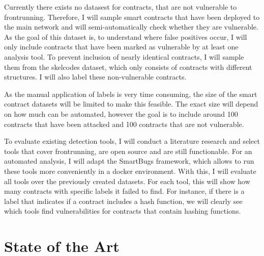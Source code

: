 \documentclass[paper=a4,fontsize=11pt,oneside,titlepage]{scrartcl}
\begin{document}
Currently there exists no datasest for contracts, that are not vulnerable to frontrunning. Therefore, I will sample smart contracts that have been deployed to the main network and will semi-automatically check whether they are vulnerable. As the goal of this dataset is, to understand where false positives occur, I will only include contracts that have been marked as vulnerable by at least one analysis tool. To prevent inclusion of nearly identical contracts, I will sample them from the skelcodes dataset\cite{di_angelo_evolution_2023}, which only consists of contracts with different structures. I will also label these non-vulnerable contracts.

As the manual application of labels is very time consuming, the size of the smart contract datasets will be limited to make this feasible. The exact size will depend on how much can be automated, however the goal is to include around 100 contracts that have been attacked and 100 contracts that are not vulnerable.

To evaluate existing detection tools, I will conduct a literature research and select tools that cover frontrunning, are open source and are still functionable. For an automated analysis, I will adapt the SmartBugs framework\cite{di_angelo_smartbugs_2023}, which allows to run these tools more conveniently in a docker environment. With this, I will evaluate all tools over the previously created datasets. For each tool, this will show how many contracts with specific labels it failed to find. For instance, if there is a label that indicates if a contract includes a hash function, we will clearly see which tools find vulnerabilities for contracts that contain hashing functions.


\iffalse
\begin{itemize}
\item How will the goals and results of \autoref{sec:results} be addressed and achieved?
\item What working directions/methods will be used and investigated?
\item How do you plan to validate/evaluate your results?
\end{itemize}
\fi

\section{State of the Art}
\label{sec:relatedWork}
\end{document}
